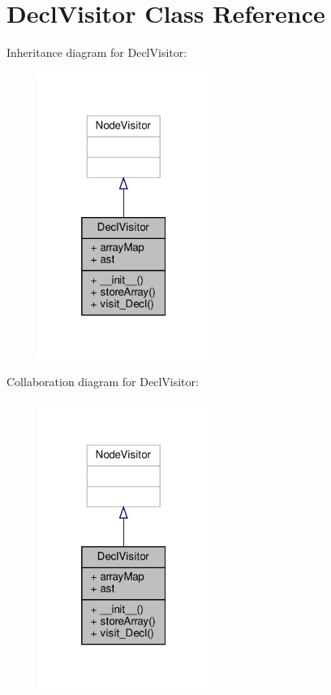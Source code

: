 \hypertarget{classVisitors_1_1DeclVisitor}{}\section{Decl\+Visitor Class Reference}
\label{classVisitors_1_1DeclVisitor}


Inheritance diagram for Decl\+Visitor\+:\nopagebreak
\begin{figure}[H]
\begin{center}
\leavevmode
\includegraphics[width=157pt]{classVisitors_1_1DeclVisitor__inherit__graph}
\end{center}
\end{figure}


Collaboration diagram for Decl\+Visitor\+:\nopagebreak
\begin{figure}[H]
\begin{center}
\leavevmode
\includegraphics[width=157pt]{classVisitors_1_1DeclVisitor__coll__graph}
\end{center}
\end{figure}
